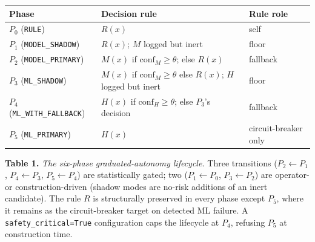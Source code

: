 {\def\LTcaptype{none} %
\begin{longtable}[]{@{}
  >{\raggedright\arraybackslash}p{}
  >{\raggedright\arraybackslash}p{}
  >{\raggedright\arraybackslash}p{}@{}}
\toprule\noalign{}
\begin{minipage}[b]{\linewidth}\raggedright
Phase
\end{minipage} & \begin{minipage}[b]{\linewidth}\raggedright
Decision rule
\end{minipage} & \begin{minipage}[b]{\linewidth}\raggedright
Rule role
\end{minipage} \\
\midrule\noalign{}
\endhead
\bottomrule\noalign{}
\endlastfoot
\(P_0\) (\texttt{RULE}) & \(R(x)\) & self \\
\(P_1\) (\texttt{MODEL\_SHADOW}) & \(R(x)\); \(M\) logged but inert &
floor \\
\(P_2\) (\texttt{MODEL\_PRIMARY}) & \(M(x)\) if
\(\text{conf}_M \ge \theta\); else \(R(x)\) & fallback \\
\(P_3\) (\texttt{ML\_SHADOW}) & \(M(x)\) if \(\text{conf}_M \ge \theta\)
else \(R(x)\); \(H\) logged but inert & floor \\
\(P_4\) (\texttt{ML\_WITH\_FALLBACK}) & \(H(x)\) if
\(\text{conf}_H \ge \theta\); else \(P_3\)'s decision & fallback \\
\(P_5\) (\texttt{ML\_PRIMARY}) & \(H(x)\) & circuit-breaker only \\
\end{longtable}
}

\textbf{Table 1.} \emph{The six-phase graduated-autonomy lifecycle.}
Three transitions (\(P_2 \leftarrow P_1\), \(P_4 \leftarrow P_3\),
\(P_5 \leftarrow P_4\)) are statistically gated; two
(\(P_1 \leftarrow P_0\), \(P_3 \leftarrow P_2\)) are operator- or
construction-driven (shadow modes are no-risk additions of an inert
candidate). The rule \(R\) is structurally preserved in every phase
except \(P_5\), where it remains as the circuit-breaker target on
detected ML failure. A \texttt{safety\_critical=True} configuration caps
the lifecycle at \(P_4\), refusing \(P_5\) at construction time.


